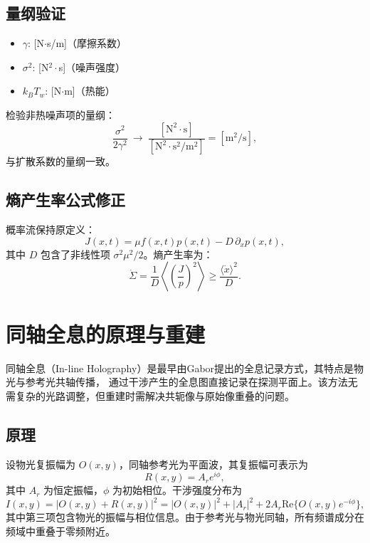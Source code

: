 \documentclass[a4paper]{report} %
\begin{document}
\subsection{量纲验证}
\begin{itemize}
    \item $\gamma$: [N$\cdot$s/m]（摩擦系数）
    \item $\sigma^2$: [N$^{2}\cdot$s]（噪声强度）
    \item $k_B T_w$: [N$\cdot$m]（热能）
\end{itemize}
检验非热噪声项的量纲：
\begin{equation}
\frac{\sigma^2}{2\gamma^2} \ \rightarrow\  \frac{\mathrm{[N^2 \cdot s]}}{\mathrm{[N^2 \cdot s^2 / m^2]}} = \mathrm{[m^2/s]},
\end{equation}
与扩散系数的量纲一致。

\subsection{熵产生率公式修正}
概率流保持原定义：
\begin{equation}
J(x,t) = \mu f(x,t)p(x,t) - D \, \partial_x p(x,t),
\end{equation}
其中 $D$ 包含了非线性项 $\sigma^2 \mu^2 / 2$。熵产生率为：
\begin{equation}
\dot{\Sigma} = \frac{1}{D} \left\langle \left( \frac{J}{p} \right)^2 \right\rangle
\geq \frac{\langle \dot{x} \rangle^2}{D}.
\end{equation}

\section{同轴全息的原理与重建}
同轴全息（In-line Holography）是最早由Gabor提出的全息记录方式，其特点是物光与参考光共轴传播，
通过干涉产生的全息图直接记录在探测平面上。该方法无需复杂的光路调整，但重建时需解决共轭像与原始像重叠的问题。
\subsection{原理}
设物光复振幅为 $O(x,y)$，同轴参考光为平面波，其复振幅可表示为
\begin{equation}
R(x,y) = A_r e^{i\phi},
\end{equation}
其中 $A_r$ 为恒定振幅，$\phi$ 为初始相位。干涉强度分布为
\begin{equation}
I(x,y) = |O(x,y) + R(x,y)|^2 = |O(x,y)|^2 + |A_r|^2 + 2A_r \text{Re}\{O(x,y)e^{-i\phi}\},
\end{equation}
其中第三项包含物光的振幅与相位信息。由于参考光与物光同轴，所有频谱成分在频域中重叠于零频附近。
\end{document}
